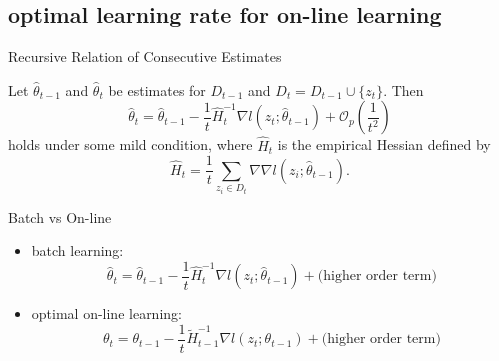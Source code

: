 \documentclass[fleqn,aspectratio=1610]{beamer}
\begin{document}
\subsection{optimal learning rate for on-line learning}
\label{sec:org61aad79}
\begin{frame}[label={sec:org212f3e6}]{Recursive Relation of Consecutive Estimates}
\begin{lemma}\label{sec:org4ba60ac}
Let \(\hat\theta_{t-1}\) and \(\hat\theta_{t}\) be estimates for
\(D_{t-1}\) and \(D_{t}=D_{t-1}\cup\{z_{t}\}\).
Then
\begin{equation}
  \hat\theta_{t}
  =\hat\theta_{t-1}
  -\frac{1}{t}\hat{H}_{t}^{-1}\nabla l(z_{t};\hat\theta_{t-1})
  +\mathcal{O}_p\left(\frac{1}{t^2}\right)
\end{equation}
holds under some mild condition,
where \(\hat{H}_{t}\) is the empirical Hessian defined by
\begin{equation}
  \hat{H}_{t}=\frac{1}{t}\sum_{z_{i}\in D_{t}}
  \nabla\nabla l(z_{i};\hat\theta_{t-1}).
\end{equation}
\end{lemma}
\end{frame}
\begin{frame}[label={sec:orge737091}]{Batch vs On-line}
\begin{itemize}
\item batch learning:
\begin{equation}
  \hat\theta_{t}
  =\hat\theta_{t-1}
  -\frac{1}{t}\hat{H}_{t}^{-1}\nabla l(z_{t};\hat\theta_{t-1})
  +\text{(higher order term)}
\end{equation}
\item optimal on-line learning:
\begin{equation}
  \theta_{t}
  =\theta_{t-1}
  -\frac{1}{t}\tilde{H}_{t-1}^{-1}\nabla l(z_{t};\theta_{t-1})
  +\text{(higher order term)}
\end{equation}
\end{itemize}
\end{frame}
\end{document}
